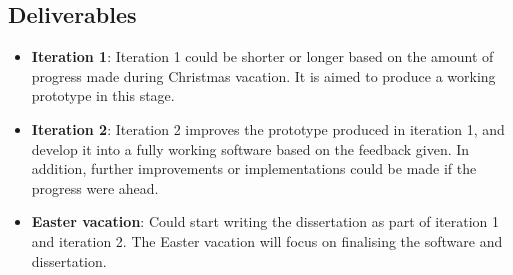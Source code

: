 \documentclass[12pt, a4paper]{report}
\begin{document}
\subsection{Deliverables}
\begin{itemize}
	\item \textbf{Iteration 1}: Iteration 1 could be shorter or longer based on the amount of progress
	made during Christmas vacation. It is aimed to produce a working prototype in this stage.
  \item \textbf{Iteration 2}: Iteration 2 improves the prototype produced in iteration 1, and
  develop it into a fully working software based on the feedback given. In addition, further
  improvements or implementations could be made if the progress were ahead.
  \item \textbf{Easter vacation}: Could start writing the dissertation as part of iteration 1 and
  iteration 2. The Easter vacation will focus on finalising the software and dissertation.
\end{itemize}





\printbibliography[heading=bibintoc]
\end{document}
